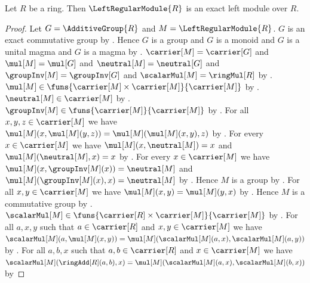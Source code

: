 \begin{theorem}\label{spike_left_regular_module_is_exact}
    Let $R$ be a ring.
    Then $\LeftRegularModule{R}$ is an exact left module over $R$.
\end{theorem}
\begin{proof}
    Let $G=\AdditiveGroup{R}$ and $M=\LeftRegularModule{R}$.
    $G$ is an exact commutative group by
        .
    Hence $G$ is a group and $G$ is a monoid and
        $G$ is a unital magma and $G$ is a magma by
        .
    $\carrier[M]=\carrier[G]$ and $\mul[M]=\mul[G]$ and
        $\neutral[M]=\neutral[G]$ and
        $\groupInv[M]=\groupInv[G]$ and
        $\scalarMul[M]=\ringMul[R]$ by
        .
    $\mul[M]\in
        \funs{\carrier[M]\times\carrier[M]}{\carrier[M]}$ by
        .
    $\neutral[M]\in\carrier[M]$ by .
    $\groupInv[M]\in\funs{\carrier[M]}{\carrier[M]}$ by
        .
    For all $x,y,z\in\carrier[M]$ we have
        $\mul[M](x,\mul[M](y,z))=\mul[M](\mul[M](x,y),z)$ by
        .
    For every $x\in\carrier[M]$ we have
        $\mul[M](x,\neutral[M])=x$ and
        $\mul[M](\neutral[M],x)=x$ by
        .
    For every $x\in\carrier[M]$ we have
        $\mul[M](x,\groupInv[M](x))=\neutral[M]$ and
        $\mul[M](\groupInv[M](x),x)=\neutral[M]$ by
        .
    Hence $M$ is a group by
        .
    For all $x,y\in\carrier[M]$ we have
        $\mul[M](x,y)=\mul[M](y,x)$ by
        .
    Hence $M$ is a commutative group by
        .
    $\scalarMul[M]\in
        \funs{\carrier[R]\times\carrier[M]}{\carrier[M]}$ by
        .
    For all $a,x,y$ such that
        $a\in\carrier[R]$ and $x,y\in\carrier[M]$ we have
        $\scalarMul[M](a,\mul[M](x,y))
            =\mul[M](\scalarMul[M](a,x),\scalarMul[M](a,y))$ by
        .
    For all $a,b,x$ such that
        $a,b\in\carrier[R]$ and $x\in\carrier[M]$ we have
        $\scalarMul[M](\ringAdd[R](a,b),x)
            =\mul[M](\scalarMul[M](a,x),\scalarMul[M](b,x))$ by
\end{proof}
